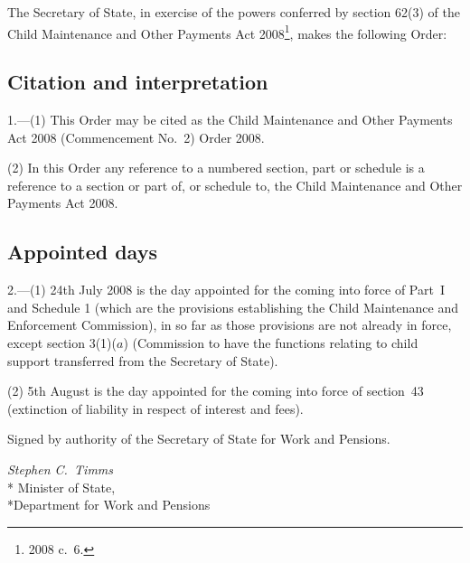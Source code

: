 \documentclass[12pt,a4paper]{article}
\title{\regstitle}
\author{S.I.\ 2008 No.\ 2033 (C.~97)}
\date{Made
23rd July 2008
}
\begin{document}
\maketitle

\noindent
The Secretary of State, in exercise of the powers conferred by section 62(3) of the Child Maintenance and Other Payments Act 2008\footnote{2008 c.~6.}, makes the following Order: 

{\sloppy

\tableofcontents

}

\bigskip

\setcounter{secnumdepth}{-2}

\subsection[1. Citation and interpretation]{Citation and interpretation}

1.---(1)  This Order may be cited as the Child Maintenance and Other Payments Act 2008 (Commencement No.~2) Order 2008.

(2) In this Order any reference to a numbered section, part or schedule is a reference to a section or part of, or schedule to, the Child Maintenance and Other Payments Act 2008.

\subsection[2. Appointed days]{Appointed days}

2.---(1)  24th July 2008 is the day appointed for the coming into force of Part~I and Schedule 1 (which are the provisions establishing the Child Maintenance and Enforcement Commission), in so far as those provisions are not already in force, except section 3(1)($a$)  (Commission to have the functions relating to child support transferred from the Secretary of State).

(2) 5th August is the day appointed for the coming into force of section~43 (extinction of liability in respect of interest and fees). 

\bigskip

Signed 
by authority of the 
Secretary of State for Work and Pensions.

{\raggedleft
\emph{Stephen C.~Timms}\\*
Minister
of State,\\*Department for Work and Pensions

}
\end{document}
